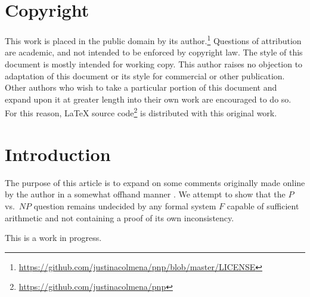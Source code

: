 \documentclass[letterpaper]{article}
\begin{document}
\section{Copyright}
This work is placed in the public domain by its author.\footnote{\url{https://github.com/justinacolmena/pnp/blob/master/LICENSE}} Questions of attribution are academic, and not intended to be enforced by copyright law. The style of this document is mostly intended for working copy.  This author raises no objection to adaptation of this document or its style for commercial or other publication.  Other authors who wish to take a particular portion of this document and expand upon it at greater length into their own work are encouraged to do so. For this reason, \LaTeX\textsuperscript{\textregistered} source code\footnote{\url{https://github.com/justinacolmena/pnp}} is distributed with this original work.

\section{Introduction}
The purpose of this article is to expand on some comments originally made online by the author in a somewhat offhand manner \cite{myinfo2016,myinfo2016a,annorlunda2016}.  We attempt to show that the $P$ vs.\ $NP$ question remains undecided by any formal system $F$ capable of sufficient arithmetic and not containing a proof of its own inconsistency.

This is a work in progress.
\end{document}
